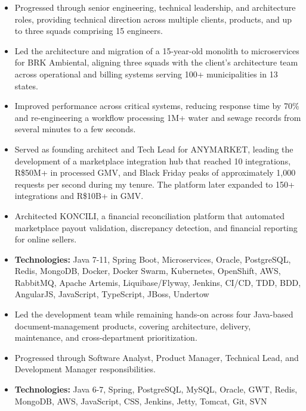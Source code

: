 \documentclass[10pt,a4paper,normalphoto]{altacv}
\newcommand{\jobguard}{\vspace{2pt}\Needspace{8\baselineskip}}
\newcommand{\techline}[1]{\vspace{3pt}\item[--]{\footnotesize\linespread{0.92}\selectfont \textbf{Technologies:} #1}}
\begin{document}
\jobguard
{}
\begin{itemize}
\item[\phantom{{\small\textbullet}}] Progressed through senior engineering, technical leadership, and architecture roles, providing technical direction across multiple clients, products, and up to three squads comprising 15 engineers.
\newline
\item Led the architecture and migration of a 15-year-old monolith to microservices for BRK Ambiental, aligning three squads with the client's architecture team across operational and billing systems serving 100+ municipalities in 13 states.
\item Improved performance across critical systems, reducing response time by 70\% and re-engineering a workflow processing 1M+ water and sewage records from several minutes to a few seconds.
\item Served as founding architect and Tech Lead for ANYMARKET, leading the development of a marketplace integration hub that reached 10 integrations, R\$50M+ in processed GMV, and Black Friday peaks of approximately 1,000 requests per second during my tenure. The platform later expanded to 150+ integrations and R\$10B+ in GMV.
\item Architected KONCILI, a financial reconciliation platform that automated marketplace payout validation, discrepancy detection, and financial reporting for online sellers.
\techline{Java 7-11, Spring Boot, Microservices, Oracle, PostgreSQL, Redis, MongoDB, Docker, Docker Swarm, Kubernetes, OpenShift, AWS, RabbitMQ, Apache Artemis, Liquibase/Flyway, Jenkins, CI/CD, TDD, BDD, AngularJS, JavaScript, TypeScript, JBoss, Undertow}
\end{itemize}

\newpage

\begin{itemize}
\item Led the development team while remaining hands-on across four Java-based document-management products, covering architecture, delivery, maintenance, and cross-department prioritization.
\item Progressed through Software Analyst, Product Manager, Technical Lead, and Development Manager responsibilities.
\techline{Java 6-7, Spring, PostgreSQL, MySQL, Oracle, GWT, Redis, MongoDB, AWS, JavaScript, CSS, Jenkins, Jetty, Tomcat, Git, SVN}
\end{itemize}
\end{document}
